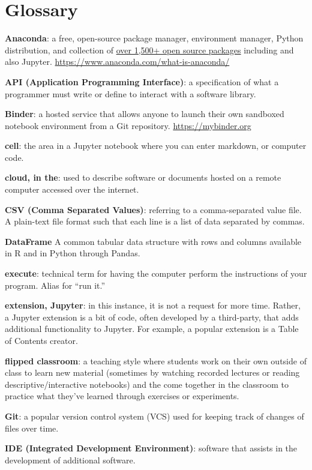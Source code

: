 \documentclass[]{book}
\begin{document}
\chapter{Glossary}\label{glossary}

\textbf{Anaconda}: a free, open-source package manager, environment
manager, Python distribution, and collection of
\href{https://docs.anaconda.com/anaconda/packages/pkg-docs/}{over 1,500+
open source packages} including and also Jupyter.
\url{https://www.anaconda.com/what-is-anaconda/}

\textbf{API (Application Programming Interface)}: a specification of
what a programmer must write or define to interact with a software
library.

\textbf{Binder}: a hosted service that allows anyone to launch their own
sandboxed notebook environment from a Git repository.
\url{https://mybinder.org}

\textbf{cell}: the area in a Jupyter notebook where you can enter
markdown, or computer code.

\textbf{cloud, in the}: used to describe software or documents hosted on
a remote computer accessed over the internet.

\textbf{CSV (Comma Separated Values)}: referring to a comma-separated
value file. A plain-text file format such that each line is a list of
data separated by commas.

\textbf{DataFrame} A common tabular data structure with rows and columns
available in R and in Python through Pandas.

\textbf{execute}: technical term for having the computer perform the
instructions of your program. Alias for ``run it.''

\textbf{extension, Jupyter}: in this instance, it is not a request for
more time. Rather, a Jupyter extension is a bit of code, often developed
by a third-party, that adds additional functionality to Jupyter. For
example, a popular extension is a Table of Contents creator.

\textbf{flipped classroom}: a teaching style where students work on
their own outside of class to learn new material (sometimes by watching
recorded lectures or reading descriptive/interactive notebooks) and the
come together in the classroom to practice what they've learned through
exercises or experiments.

\textbf{Git}: a popular version control system (VCS) used for keeping
track of changes of files over time.

\textbf{IDE (Integrated Development Environment)}: software that assists
in the development of additional software.
\end{document}
